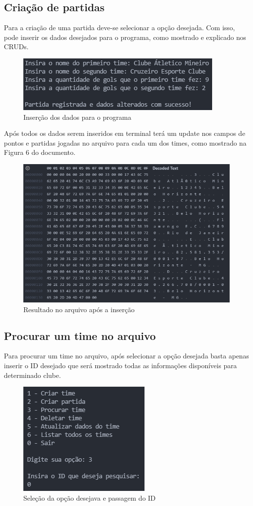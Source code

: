 \documentclass[12pt]{article}
\begin{document}
\subsection{Criação de partidas}
Para a criação de uma partida deve-se selecionar a opção desejada. Com isso, pode inserir os dados desejados para o programa, como mostrado e explicado nos CRUDs.

\newpage
\begin{figure}[h]
\centering
\includegraphics[width=.5\textwidth]{create_game_dados.png}
\caption{Inserção dos dados para o programa}
\label{fig:createGdados}
\end{figure}

Após todos os dados serem inseridos em terminal terá um update nos campos de pontos e partidas jogadas no arquivo para cada um dos times, como mostrado na Figura 6 do documento.

\begin{figure}[ht]
\centering
\includegraphics[width=.6\textwidth]{create_game_arquivo.png}
\caption{Resultado no arquivo após a inserção}
\label{fig:createGarquivo}
\end{figure}

\subsection{Procurar um time no arquivo}
Para procurar um time no arquivo, após selecionar a opção desejada basta apenas inserir o ID desejado que será mostrado todas as informações disponíveis para determinado clube.

\begin{figure}[ht]
\centering
\includegraphics[width=.3\textwidth]{selection_option_and_id.png}
\caption{Seleção da opção desejava e passagem do ID}
\label{fig:readID}
\end{figure}
\end{document}
